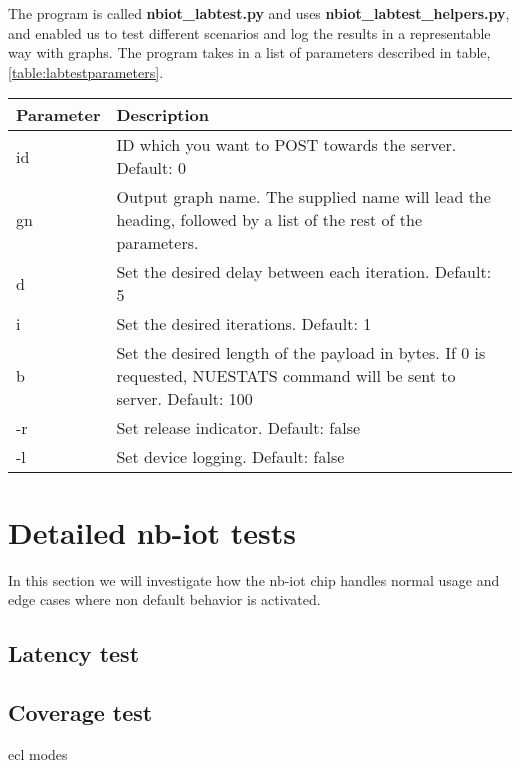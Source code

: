 \documentclass[USenglish]{ifimaster}  %
\begin{document}
The program is called \textbf{nbiot\_labtest.py} and uses \textbf{nbiot\_labtest\_helpers.py}, and enabled us to test different scenarios and log the results in a representable way with graphs. The program takes in a list of parameters described in table, \vref{table:labtestparameters}.


\begin{center} \label{table:labtestparameters}
  \begin{tabular}{ | l | m{10cm} | }
    \hline
    Parameter & Description \\
    \hline
    id & ID which you want to POST towards the server. Default: 0 \\
    \hline
    gn & Output graph name. The supplied name will lead the heading, followed by a list of the rest of the parameters. \\
    \hline
    d & Set the desired delay between each iteration. Default: 5 \\
    \hline
    i & Set the desired iterations. Default: 1 \\
    \hline
    b & Set the desired length of the payload in bytes. If 0 is requested, NUESTATS command will be sent to server. Default: 100 \\
    \hline
    -r & Set release indicator. Default: false \\
    \hline
    -l & Set device logging. Default: false \\
    \hline
  \end{tabular}
\end{center}

\section{Detailed \acrshort{nb-iot} tests} \label{section:detailedtest}
In this section we will investigate how the \acrshort{nb-iot} chip handles normal usage and edge cases where non default behavior is activated.


\subsection{Latency test} \label{ssection:latencytest}

\subsection{Coverage test} \label{ssection:coveragetest}
\acrshort{ecl} modes
\end{document}
